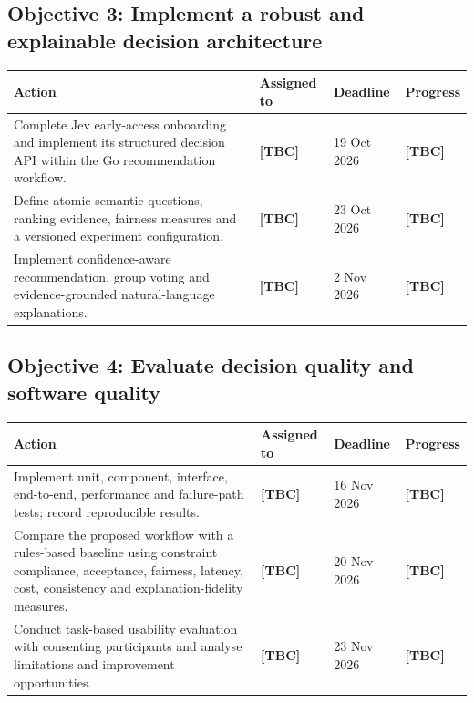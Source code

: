 \documentclass[12pt,a4paper]{article}
\newcommand{\placeholder}[1]{\textcolor{Placeholder}{\textbf{[#1]}}}
\begin{document}
\subsection*{Objective 3: Implement a robust and explainable decision architecture}

\begin{longtable}{@{}p{}p{}p{}p{}@{}}
  \toprule
  \textbf{Action} & \textbf{Assigned to} & \textbf{Deadline} & \textbf{Progress} \\
  \midrule
  \endhead
  Complete Jev early-access onboarding and implement its structured decision API within the Go recommendation workflow. & \placeholder{TBC} & 19 Oct 2026 & \placeholder{TBC} \\
  \midrule
  Define atomic semantic questions, ranking evidence, fairness measures and a versioned experiment configuration. & \placeholder{TBC} & 23 Oct 2026 & \placeholder{TBC} \\
  \midrule
  Implement confidence-aware recommendation, group voting and evidence-grounded natural-language explanations. & \placeholder{TBC} & 2 Nov 2026 & \placeholder{TBC} \\
  \bottomrule
\end{longtable}

\subsection*{Objective 4: Evaluate decision quality and software quality}

\begin{longtable}{@{}p{}p{}p{}p{}@{}}
  \toprule
  \textbf{Action} & \textbf{Assigned to} & \textbf{Deadline} & \textbf{Progress} \\
  \midrule
  \endhead
  Implement unit, component, interface, end-to-end, performance and failure-path tests; record reproducible results. & \placeholder{TBC} & 16 Nov 2026 & \placeholder{TBC} \\
  \midrule
  Compare the proposed workflow with a rules-based baseline using constraint compliance, acceptance, fairness, latency, cost, consistency and explanation-fidelity measures. & \placeholder{TBC} & 20 Nov 2026 & \placeholder{TBC} \\
  \midrule
  Conduct task-based usability evaluation with consenting participants and analyse limitations and improvement opportunities. & \placeholder{TBC} & 23 Nov 2026 & \placeholder{TBC} \\
  \bottomrule
\end{longtable}
\end{document}
